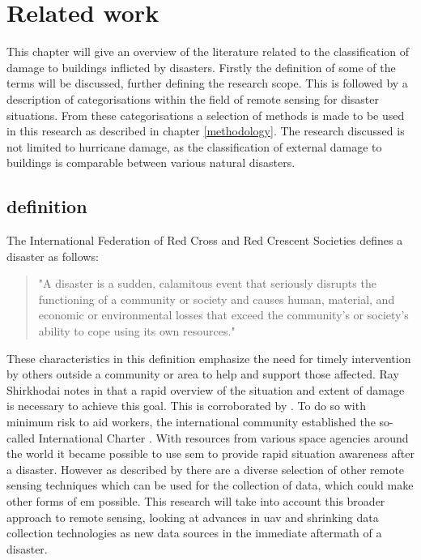 \chapter{Related work} \label{relate}
This chapter will give an overview of the literature related to the classification of damage to buildings inflicted by disasters. Firstly the definition of some of the terms will be discussed, further defining the research scope. This is followed by a description of categorisations within the field of remote sensing for disaster situations. From these categorisations a selection of methods is made to be used in this research as described in chapter \ref{methodology}. The research discussed is not limited to hurricane damage, as the classification of external damage to buildings is comparable between various natural disasters. \\
\section{definition}\label{sec:def}
The International Federation of Red Cross and Red Crescent Societies \citeyearpar{IFRC2017} defines a disaster as follows: 
\begin{quote}
"A disaster is a sudden, calamitous event that seriously disrupts the functioning of a community or society and causes human, material, and economic or environmental losses that exceed the community’s or society’s ability to cope using its own resources."
\end{quote}
These characteristics in this definition emphasize the need for timely intervention by others outside a community or area to help and support those affected. Ray Shirkhodai notes in \citet[p. i]{AlAchkar2008} that a rapid overview of the situation and extent of damage is necessary to achieve this goal. This is corroborated by \citet{Schweier2006}. To do so with minimum risk to aid workers, the international community established the so-called International Charter \citep{Bessis2003}. With resources from various space agencies around the world it became possible to use \ac{sem} to provide rapid situation awareness after a disaster. However as described by \citet{Kerle2008} there are a diverse selection of other remote sensing techniques which can be used for the collection of data, which could make other forms of \ac{em} possible. This research will take into account this broader approach to remote sensing, looking at advances in \ac{uav} and shrinking data collection technologies as new data sources in the immediate aftermath of a disaster.\\
 
